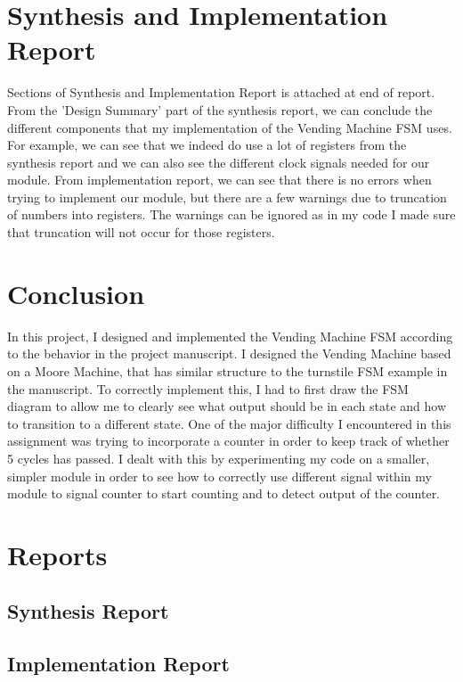 \documentclass{article}
\begin{document}
\section{Synthesis and Implementation Report}
Sections of Synthesis and Implementation Report is attached at end of report.  From the 'Design Summary' part of the synthesis report, we can conclude the different components that my implementation of the Vending Machine FSM uses. For example, we can see that we indeed do use a lot of registers from the synthesis report and we can also see the different clock signals needed for our module. From implementation report, we can see that there is no errors when trying to implement our module, but there are a few warnings due to truncation of numbers into registers. The warnings can be ignored as in my code I made sure that truncation will not occur for those registers.

\section{Conclusion} 
In this project, I designed and implemented the Vending Machine FSM according to the behavior in the project manuscript. I designed the Vending Machine based on a Moore Machine, that has similar structure to the turnstile FSM example in the manuscript. To correctly implement this, I had to first draw the FSM diagram to allow me to clearly see what output should be in each state and how to transition to a different state. One of the major difficulty I encountered in this assignment was trying to incorporate a counter in order to keep track of whether 5 cycles has passed. I dealt with this by experimenting my code on a smaller, simpler module in order to see how to correctly use different signal within my module to signal counter to start counting and to detect output of the counter. 

\newpage
\small
\section{Reports}
\subsection{Synthesis Report}

\newpage
\subsection{Implementation Report}

\end{document}
